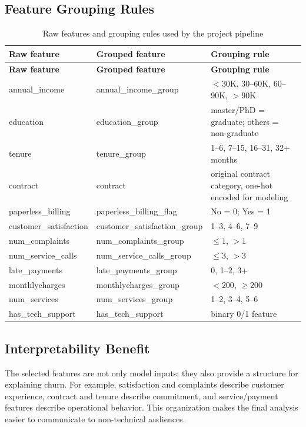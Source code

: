 \subsection{Feature Grouping Rules}
\small
\begin{longtable}{p{}p{}p{}}
\caption{Raw features and grouping rules used by the project pipeline}\\
\toprule
\textbf{Raw feature} & \textbf{Grouped feature} & \textbf{Grouping rule} \\
\midrule
\endfirsthead
\toprule
\textbf{Raw feature} & \textbf{Grouped feature} & \textbf{Grouping rule} \\
\midrule
\endhead
annual\_income & annual\_income\_group & $<30$K, 30--60K, 60--90K, $>90$K \\
education & education\_group & master/PhD = graduate; others = non-graduate \\
tenure & tenure\_group & 1--6, 7--15, 16--31, 32+ months \\
contract & contract & original contract category, one-hot encoded for modeling \\
paperless\_billing & paperless\_billing\_flag & No = 0; Yes = 1 \\
customer\_satisfaction & customer\_satisfaction\_group & 1--3, 4--6, 7--9 \\
num\_complaints & num\_complaints\_group & $\leq 1$, $>1$ \\
num\_service\_calls & num\_service\_calls\_group & $\leq 3$, $>3$ \\
late\_payments & late\_payments\_group & 0, 1--2, 3+ \\
monthlycharges & monthlycharges\_group & $<200$, $\geq 200$ \\
num\_services & num\_services\_group & 1--2, 3--4, 5--6 \\
has\_tech\_support & has\_tech\_support & binary 0/1 feature \\
\bottomrule
\end{longtable}
\normalsize

\subsection{Interpretability Benefit}
The selected features are not only model inputs; they also provide a structure
for explaining churn. For example, satisfaction and complaints describe customer
experience, contract and tenure describe commitment, and service/payment
features describe operational behavior. This organization makes the final
analysis easier to communicate to non-technical audiences.
